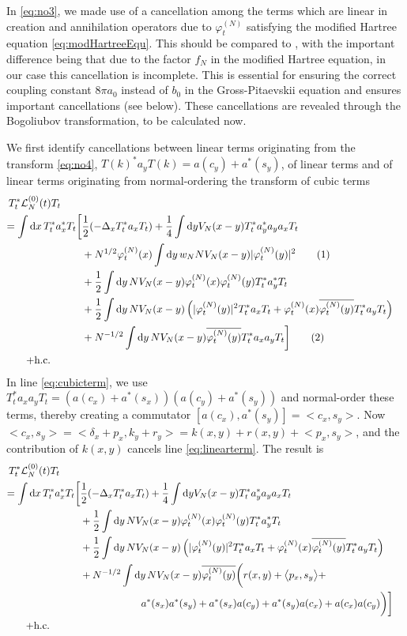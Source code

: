 \documentclass[11pt,a4paper,draft,DIV11]{scrartcl}	%
\newcommand{\di}{\textrm{d}}		%
\newcommand{\Lcal}{\mathcal{L}}		%
\newcommand{\hc}{\mbox{h.c.}}		%
\newcommand{\scal}[2]{\big<#1,#2\big>} %
\newcommand{\cc}[1]{\overline{#1}}	%
\newcommand{\ph}{\varphi_t^{(N)}}	%
\newcommand{\bd}{\begin{displaymath}}			%
\newcommand{\ed}{\end{displaymath}}
\newcommand{\tagg}[1]{ \stepcounter{equation} \tag{\theequation} \label{eq:#1} } %
\newcommand{\eqr}[1]{\eqref{eq:#1}}			%
\begin{document}
In \eqr{no3}, we made use of a cancellation among the terms which are linear in creation and annihilation operators due to $\ph$ satisfying the modified Hartree equation \eqr{modHartreeEqu}.
This should be compared to \cite{RS2009}, with the important difference being that due to the factor $f_N$ in the modified Hartree equation, in our case this cancellation is incomplete. This is essential for ensuring the correct coupling constant $8\pi a_0$ instead of $b_0$ in the Gross-Pitaevskii equation and ensures important cancellations (see below). These cancellations are revealed through the Bogoliubov transformation, to be calculated now.

We first identify cancellations between linear terms originating from the transform \eqr{no4}, $T(k)^* a_y T(k) = a(c_y) + a^*(s_y)$, of linear terms and of linear terms originating from normal-ordering the transform of cubic terms
\begin{align*}
T^*_t \Lcal^{(0)}_N(t) T_t \qquad \\
= \int \di x\, T^*_t a^*_x T_t \bigg[ &   \frac{1}{2}(-\Delta_x T^*_t a_x T_t)  + \frac{1}{4}\int \di y V_N(x-y) T^*_t a^*_y a_y a_x T_t \\
& + N^{1/2} \ph(x) \int \di y\, w_N N V_N(x-y) \lvert \ph(y) \rvert^2 \tagg{linearterm} \\
& + \frac{1}{2} \int \di y\, NV_N(x-y)  \ph(x) \ph(y)  T^*_t a^*_y T_t \\
& + \frac{1}{2} \int \di y\, NV_N(x-y) \left(  \lvert \ph(y)\rvert^2 T^*_t a_x T_t + \ph(x) \cc{\ph(y)} T^*_t a_y T_t  \right) \\
& + N^{-1/2} \int \di y\, NV_N(x-y) \cc{\ph(y)} T^*_t a_x a_y T_t  \bigg]\tagg{cubicterm} \\
+ \hc \qquad \quad
\end{align*}
In line \eqr{cubicterm}, we use $T^\ast_t a_x a_y T_t = \left( a(c_x)+a^\ast
(s_x) \right)\left( a(c_y) + a^\ast(s_y) \right)$ and normal-order these
terms, thereby creating a commutator $[a(c_x),a^\ast(s_y)] = \scal{c_x}{s_y}$. Now $\scal{c_x}{s_y} = \scal{\delta_x + p_x}{k_y + r_y} = k(x,y) + r(x,y) + \scal{p_x}{s_y}$, and the contribution of $k(x,y)$ cancels line \eqr{linearterm}. The result is
\begin{align*}
T^*_t \Lcal^{(0)}_N(t) T_t \qquad \\
= \int \di x\, T^*_t a^*_x T_t \bigg[ &   \frac{1}{2}(-\Delta_x T^*_t a_x T_t)  + \frac{1}{4}\int \di y V_N(x-y) T^*_t a^*_y a_y a_x T_t \\
& + \frac{1}{2} \int \di y\, NV_N(x-y)  \ph(x) \ph(y)  T^*_t a^*_y T_t \\
& + \frac{1}{2} \int \di y\, NV_N(x-y) \left(  \lvert \ph(y)\rvert^2 T^*_t a_x T_t + \ph(x) \cc{\ph(y)} T^*_t a_y T_t  \right) \\
& + N^{-1/2} \int \di y\, NV_N(x-y) \cc{\ph(y)} \bigg( r(x,y) + \scal{p_x}{s_y} + \\
& \qquad \qquad \hspace{0.7cm}   a^*(s_x) a^*(s_y) + a^*(s_x) a(c_y)  + a^*(s_y) a(c_x) + a(c_x) a(c_y)  \bigg)  \bigg] \\
+ \hc \qquad \quad
\end{align*}
\end{document}
